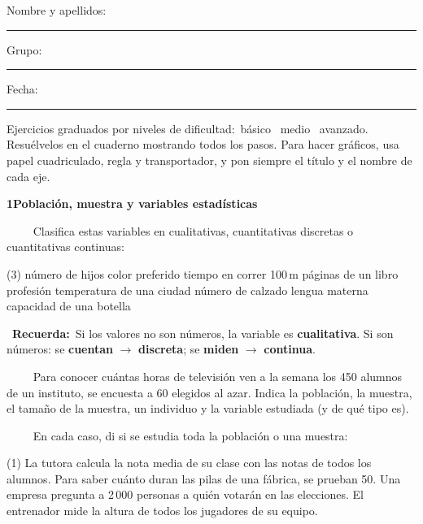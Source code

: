\documentclass[11pt,a4paper]{article}
\newcommand{\estrelles}[1]{{\color{accent}\ifcase#1\or\faStar\faStar[regular]\faStar[regular]\or\faStar\faStar\faStar[regular]\or\faStar\faStar\faStar\fi}}
\newcounter{exer}
\newcommand{\ex}[1]{\par\needspace{4\baselineskip}\medskip\stepcounter{exer}\noindent{\color{navy}\bfseries\theexer.}\ \ {\small\estrelles{#1}}\ \ }
\newcommand{\seccio}[2]{\par\needspace{10\baselineskip}\bigskip
  \begin{tcolorbox}[colback=navy,colframe=navy,coltext=white,arc=2mm,boxrule=0pt,left=3mm,right=3mm,top=1.2mm,bottom=1.2mm]
  {\large\bfseries #1\quad #2}
  \end{tcolorbox}\vspace{-2pt}}
\newcommand{\recorda}[1]{\par\smallskip\begin{tcolorbox}[colback=accent!7,colframe=accent!55,arc=2mm,boxrule=0.5pt,left=2.5mm,right=2.5mm,top=1mm,bottom=1mm]\small{\color{accent}\faLightbulb[regular]}\ \textbf{Recuerda:}\ #1\end{tcolorbox}}
\begin{document}
\thispagestyle{primera}

\vspace{10pt}
Nombre y apellidos: \rule{6.6cm}{0.4pt}\hfill Grupo: \rule{1.6cm}{0.4pt}\hfill Fecha: \rule{2.2cm}{0.4pt}
\vspace{8pt}

\begin{tcolorbox}[colback=soft,colframe=soft,arc=2mm,left=3mm,right=3mm,top=1.5mm,bottom=1.5mm]
\small Ejercicios graduados por niveles de dificultad:\quad \estrelles{1}\ básico \qquad \estrelles{2}\ medio \qquad \estrelles{3}\ avanzado.\\[2pt] Resuélvelos en el cuaderno mostrando todos los pasos. Para hacer gráficos, usa papel cuadriculado, regla y transportador, y pon siempre el título y el nombre de cada eje.
\end{tcolorbox}

\seccio{1}{Población, muestra y variables estadísticas}

\ex{1} Clasifica estas variables en cualitativas, cuantitativas discretas o cuantitativas continuas:\begin{tasks}(3)
  \task número de hijos
  \task color preferido
  \task tiempo en correr 100\,m
  \task páginas de un libro
  \task profesión
  \task temperatura de una ciudad
  \task número de calzado
  \task lengua materna
  \task capacidad de una botella
\end{tasks}\recorda{Si los valores no son números, la variable es \textbf{cualitativa}. Si son números: se \textbf{cuentan} $\to$ \textbf{discreta}; se \textbf{miden} $\to$ \textbf{continua}.}

\ex{1} Para conocer cuántas horas de televisión ven a la semana los 450 alumnos de un instituto, se encuesta a 60 elegidos al azar. Indica la población, la muestra, el tamaño de la muestra, un individuo y la variable estudiada (y de qué tipo es).

\ex{1} En cada caso, di si se estudia toda la población o una muestra:\begin{tasks}(1)
  \task La tutora calcula la nota media de su clase con las notas de todos los alumnos.
  \task Para saber cuánto duran las pilas de una fábrica, se prueban 50.
  \task Una empresa pregunta a 2\,000 personas a quién votarán en las elecciones.
  \task El entrenador mide la altura de todos los jugadores de su equipo.
\end{tasks}
\end{document}
